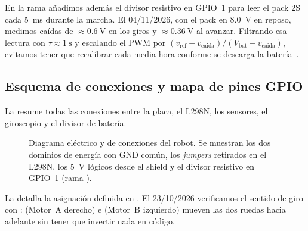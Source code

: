 En la rama  añadimos además el divisor resistivo en GPIO~1 para leer el pack 2S cada \SI{5}{\milli\second} durante la marcha. El 04/11/2026, con el pack en \SI{8.0}{\volt} en reposo, medimos caídas de $\approx\SI{0.6}{\volt}$ en los giros y $\approx\SI{0.36}{\volt}$ al avanzar. Filtrando esa lectura con $\tau \approx \SI{1}{\second}$ y escalando el PWM por $(v_{\text{ref}} - v_{\text{caida}}) / (V_{\text{bat}} - v_{\text{caida}})$, evitamos tener que recalibrar  cada media hora conforme se descarga la batería~\cite{repo2026agentelaberinto}.

\subsection{Esquema de conexiones y mapa de pines GPIO}
\label{subsec:esquema-pines}

La  resume todas las conexiones entre la placa, el L298N, los sensores, el giroscopio y el divisor de batería.

\begin{figure}[H]
  \centering
  
  \caption{Diagrama eléctrico y de conexiones del robot. Se muestran los dos dominios de energía con GND común, los \emph{jumpers} retirados en el L298N, los \SI{5}{\volt} lógicos desde el shield y el divisor resistivo en GPIO~1 (rama ).}
  \label{fig:cableado}
\end{figure}

La  detalla la asignación definida en . El 23/10/2026 verificamos el sentido de giro con :  (Motor~A derecho) e  (Motor~B izquierdo) mueven las dos ruedas hacia adelante sin tener que invertir nada en código.

